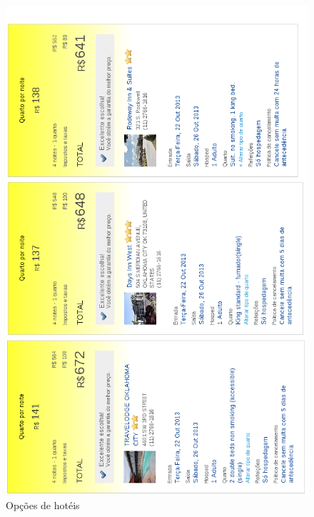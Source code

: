 \documentclass[brazil]{article}
\begin{document}
\begin{figure}[htp]
\begin{center}
  \includegraphics[width=0.9\linewidth]{hoteis.png}
  \caption[Opções de hotéis]{Opções de hotéis}
\end{center}
\end{figure}
\end{document}
